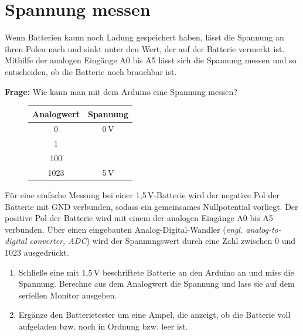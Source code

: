 \newpage
\section{Spannung messen}
\label{sec:spannung-messen}

Wenn Batterien kaum noch Ladung gespeichert haben, lässt die Spannung an ihren Polen nach und sinkt unter den Wert, der auf der Batterie vermerkt ist. Mithilfe der analogen Eingänge A0 bis A5 lässt sich die Spannung messen und so entscheiden, ob die Batterie noch brauchbar ist.

\begin{ziel}
	\textbf{Frage:} Wie kann man mit dem Arduino eine Spannung messen?
\end{ziel}

\begin{projekt}\label{proj:batterietesterklein}
	\begin{figure}
		\centering
		\vspace{-2\baselineskip}
		\begin{tabular}{c | c}\footnotesize
			\textbf{Analogwert} & \textbf{Spannung} \\ \hline
			0 & 0\,V \\ \hline
			1 &  \\ \hline
			100 &  \\ \hline
			1023 & 5\,V \\ \hline
		\end{tabular}
	\end{figure}
	Für eine einfache Messung bei einer 1,5\,V-Batterie wird der negative Pol der Batterie mit GND verbunden, sodass ein gemeinsames Nullpotential vorliegt. Der positive Pol der Batterie wird mit einem der analogen Eingänge A0 bis A5 verbunden. Über einen eingebauten Analog-Digital-Wandler (\emph{engl. analog-to-digital converter, ADC}) wird der Spannungswert durch eine Zahl zwischen 0 und 1023 ausgedrückt.
	
	\begin{enumerate}[label=\alph*), itemsep=0mm, parsep=0mm]
		\item Schließe eine mit 1,5\,V beschriftete Batterie an den Arduino an und miss die Spannung. Berechne aus dem Analogwert die Spannung und lass sie auf dem seriellen Monitor ausgeben.
		\item Ergänze den Batterietester um eine Ampel, die anzeigt, ob die Batterie voll aufgeladen bzw. noch in Ordnung bzw. leer ist.
	\end{enumerate}	
\end{projekt}

